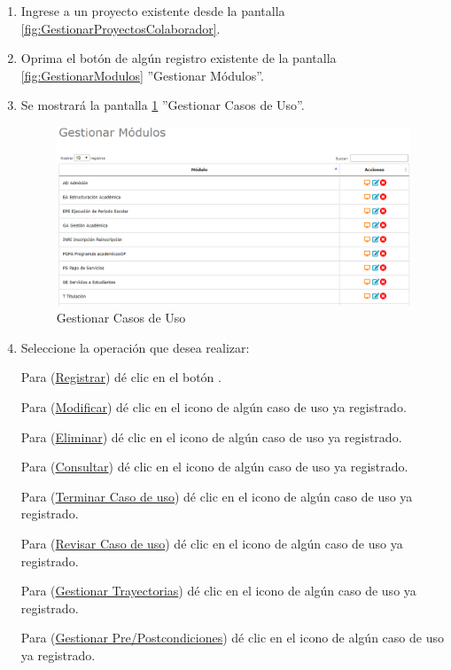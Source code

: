 			\begin{enumerate}
				
			\item Ingrese a un proyecto existente desde la pantalla \ref{fig:GestionarProyectosColaborador}.
			
			\item Oprima el botón \IUCU{} de algún registro existente de la pantalla \ref{fig:GestionarModulos} ''Gestionar Módulos''.
	
			\item Se mostrará la pantalla \ref{fig:GestionarCU} ''Gestionar Casos de Uso''.

			\begin{figure}[htbp!]
				\begin{center}
					\includegraphics[scale=0.6]{roles/lider/casosUso/pantallas/IU5gestionarModulos}
					\caption{Gestionar Casos de Uso}
					\label{fig:GestionarCU}
				\end{center}
			\end{figure}
		
				\item Seleccione la operación que desea realizar:
			
			Para (\hyperlink{cv:registrarCU}{Registrar}) dé clic en el botón \IURegistrar.
			
			Para (\hyperlink{cv:modificarCU}{Modificar}) dé clic en el icono \IUEditar{} de algún caso de uso ya registrado.
			
			Para (\hyperlink{cv:eliminarCU}{Eliminar}) dé clic en el icono \IUBotonEliminar{} de algún caso de uso ya registrado.
			
			Para (\hyperlink{cv:consultarCU}{Consultar}) dé clic en el icono \IUConsultar{} de algún caso de uso ya registrado.
			
			Para (\hyperlink{cv:terminarCU}{Terminar Caso de uso}) dé clic en el icono \IUTerminar{} de algún caso de uso ya registrado.
			
			Para (\hyperlink{cv:revisarCU}{Revisar Caso de uso}) dé clic en el icono \IURevisar{} de algún caso de uso ya registrado.
			
			Para (\hyperlink{cv:GestionarTray}{Gestionar Trayectorias}) dé clic en el icono \IUTray{} de algún caso de uso ya registrado.
			
			Para (\hyperlink{cv:GestionarTray}{Gestionar Pre/Postcondiciones}) dé clic en el icono \IUCondiciones de algún caso de uso ya registrado.
			\end{enumerate}